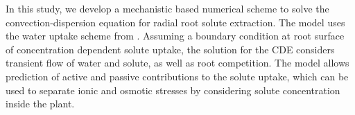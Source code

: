In this study, we develop a mechanistic based numerical scheme to solve the convection-dispersion equation for radial root solute extraction.
The model uses the water uptake scheme from \cite{lierwater}.
Assuming a boundary condition at root surface of concentration dependent solute uptake, the solution for the CDE considers transient flow of water and solute, as well as root competition.
The model allows prediction of active and passive contributions to the solute uptake, which can be used to separate ionic and osmotic stresses by considering solute concentration inside the plant.
